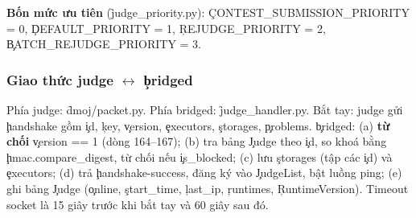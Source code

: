 \textbf{Bốn mức ưu tiên} (\f{judge_priority.py}): \c{CONTEST_SUBMISSION_PRIORITY = 0}, \c{DEFAULT_PRIORITY = 1}, \c{REJUDGE_PRIORITY = 2}, \c{BATCH_REJUDGE_PRIORITY = 3}. \tS

\subsubsection{Giao thức judge $\leftrightarrow$ \c{bridged}}
Phía judge: \f{dmoj/packet.py}. Phía bridged: \f{judge_handler.py}. Bắt tay: judge gửi \c{handshake} gồm \c{id}, \c{key}, \c{version}, \c{executors}, \c{storages}, \c{problems}. \c{bridged}: (a) \textbf{từ chối} \c{version == 1} (dòng 164--167); (b) tra bảng \c{Judge} theo \c{id}, so khoá bằng \c{hmac.compare_digest}, từ chối nếu \c{is_blocked}; (c) lưu \c{storages} (tập các \c{id}) và \c{executors}; (d) trả \c{handshake-success}, đăng ký vào \c{JudgeList}, bật luồng ping; (e) ghi bảng \c{Judge} (\c{online}, \c{start_time}, \c{last_ip}, \c{runtimes}, \c{RuntimeVersion}). Timeout socket là 15 giây trước khi bắt tay và 60 giây sau đó. \tS

